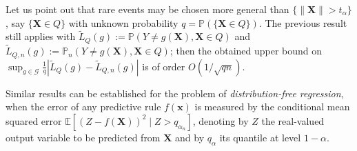 Let us point out that rare events may be chosen more general than
$\{\|\mathbf{X}\| > t_\alpha \}$, say $\{\mathbf{X} \in Q \}$ with unknown probability
$q=\mathbb{P}(\{\mathbf{X} \in Q \})$. The previous result still applies with
$\widetilde L_Q(g) := \mathbb{P}\left ( Y \neq g(\mathbf{X}), \mathbf{X} \in Q\right)$
and $\widetilde L_{Q,n}(g) := \mathbb{P}_n\left ( Y \neq g(\mathbf{X}), \mathbf{X} \in
  Q\right)$; then the obtained upper bound on $\sup_{g \in
  \mathcal{G}} \frac{1}{q} \left |  \widetilde L_Q(g) - \widetilde
  L_{Q,n}(g) \right|$ is of order $O(1/\sqrt{qn}). $ %

Similar results can be established for the problem of \textit{distribution-free regression}, when the error of any predictive rule $f(\mathbf{x})$ is measured by the conditional mean squared error $\mathbb{E}[(Z-f(\mathbf{X}))^2\mid Z>q_{\alpha_n}]$, denoting by $Z$ the real-valued output variable to be predicted from $\mathbf{X}$ and by $q_{\alpha}$ its quantile at level $1-\alpha$.

